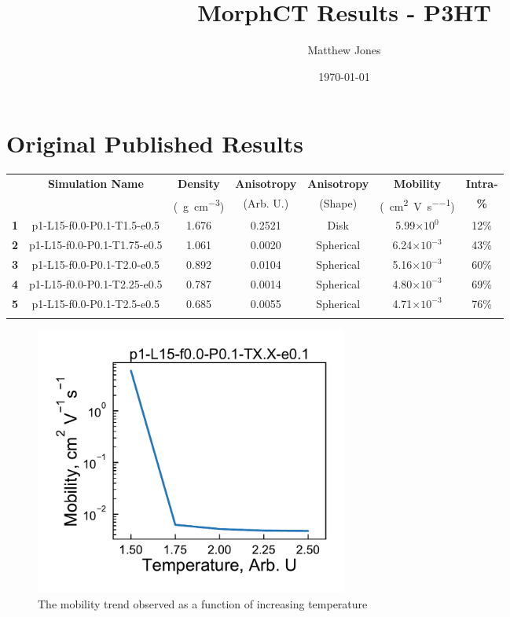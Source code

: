 \documentclass[12pt]{article}
\title{MorphCT Results - P3HT}
\author{Matthew Jones}
\date{\today}
\def\mobunits{\square\centi\meter\per\volt\per\second}
\def\gcm{\gram\per\cubic\centi\meter}
\def\ccg{\cellcolor{gray}}
\begin{document}
\maketitle

\section{Original Published Results}

\begin{center}
\begin{tabular}{| c | c | c | c | c | c | c |}
\hline
\rule{0pt}{2.5ex} 
\multirow{2}{*}{\textbf{ID}}&\multirow{2}{*}{\textbf{Simulation Name}}&\textbf{Density}&\textbf{Anisotropy}&\textbf{Anisotropy}&\textbf{Mobility}&\textbf{Intra-}\\
                            &&(\SI{}{\gcm})&(Arb. U.)&(Shape)&(\SI{}{\mobunits})&\textbf{\%}\\
\hhline{|=======|}
\textbf{\ccg1}&\rule{0pt}{2.5ex}\ccg p1-L15-f0.0-P0.1-T1.5-e0.5&\ccg 1.676&\ccg 0.2521&\ccg Disk&\ccg5.99$\times 10^{0}$&\ccg12\%\\
\textbf{2}&\rule{0pt}{2.5ex}p1-L15-f0.0-P0.1-T1.75-e0.5&1.061&0.0020&Spherical&6.24$\times 10^{-3}$&43\%\\
\textbf{\ccg3}&\rule{0pt}{2.5ex}\ccg p1-L15-f0.0-P0.1-T2.0-e0.5&\ccg 0.892&\ccg 0.0104&\ccg Spherical&\ccg5.16$\times 10^{-3}$&\ccg60\%\\
\textbf{4}&\rule{0pt}{2.5ex}p1-L15-f0.0-P0.1-T2.25-e0.5&0.787&0.0014&Spherical&4.80$\times 10^{-3}$&69\%\\
\textbf{\ccg5}&\rule{0pt}{2.5ex}\ccg p1-L15-f0.0-P0.1-T2.5-e0.5&\ccg 0.685&\ccg 0.0055&\ccg Spherical&\ccg4.71$\times 10^{-3}$&\ccg76\%\\
\hhline{-------}
\end{tabular}\label{table:mob}
\end{center}

\begin{figure}[h!]\centering
	\includegraphics[width=0.5\textwidth]{Figures/PublishedHoleMob.pdf}
    \caption{The mobility trend observed as a function of increasing temperature}
	\label{fig:MSD}
\end{figure}
\end{document}
